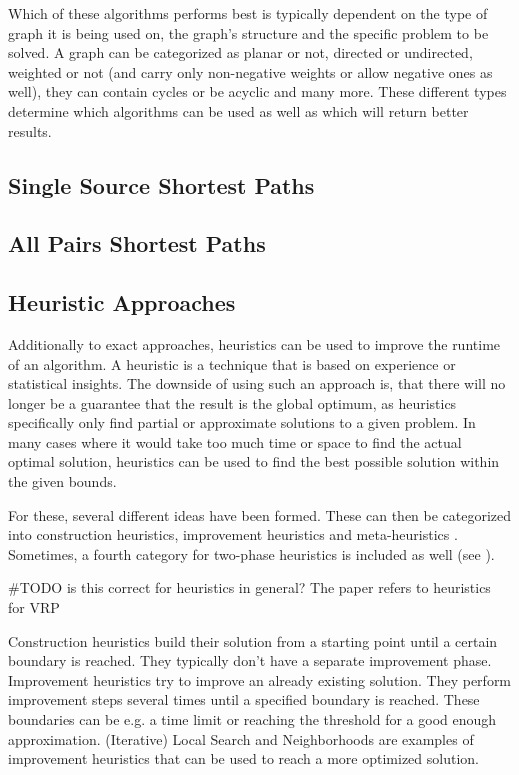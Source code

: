 Which of these algorithms performs best is typically dependent on the type of graph it is being used on, the graph's structure and the specific problem to be solved. 
A graph can be categorized as planar or not, directed or undirected, weighted or not (and carry only non-negative weights or allow negative ones as well), they can contain cycles or be acyclic and many more. 
These different types determine which algorithms can be used as well as which will return better results.

\subsection{Single Source Shortest Paths}


\subsection{All Pairs Shortest Paths}


\subsection{Heuristic Approaches}

Additionally to exact approaches, heuristics can be used to improve the runtime of an algorithm.
A heuristic is a technique that is based on experience or statistical insights.
The downside of using such an approach is, that there will no longer be a guarantee that the result is the global optimum, as heuristics specifically only find partial or approximate solutions to a given problem. 
In many cases where it would take too much time or space to find the actual optimal solution, heuristics can be used to find the best possible solution within the given bounds.

For these, several different ideas have been formed. 
These can then be categorized into construction heuristics, improvement heuristics and meta-heuristics \cite{ropkeHeuristicExactAlgorithms2005}.
Sometimes, a fourth category for two-phase heuristics is included as well (see \cite{laporteClassicalHeuristicsCapacitated2002a}).

\#TODO is this correct for heuristics in general? The paper refers to heuristics for VRP

Construction heuristics build their solution from a starting point until a certain boundary is reached. 
They typically don't have a separate improvement phase.
Improvement heuristics try to improve an already existing solution.
They perform improvement steps several times until a specified boundary is reached.
These boundaries can be e.g. a time limit or reaching the threshold for a good enough approximation.
(Iterative) Local Search and Neighborhoods are examples of improvement heuristics that can be used to reach a more optimized solution. \cite{laporteClassicalHeuristicsCapacitated2002a, ropkeHeuristicExactAlgorithms2005}



